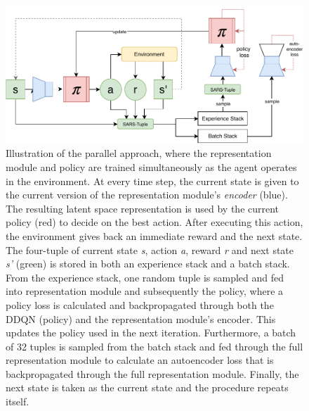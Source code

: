 \begin{figure}[ht]
	\centering
	\includegraphics[width=\textwidth]{img/full-model.pdf}
	\caption{Illustration of the parallel approach, where the representation module and policy are trained simultaneously as the agent operates in the environment. At every time step, the current state is given to the current version of the representation module's \textit{encoder} (blue). The resulting latent space representation is used by the current policy (red) to decide on the best action. After executing this action, the environment gives back an immediate reward and the next state. The four-tuple of current state \textit{s}, action \textit{a}, reward \textit{r} and next state \textit{s'} (green) is stored in both an experience stack and a batch stack. From the experience stack, one random tuple is sampled and fed into representation module and subsequently the policy, where a policy loss is calculated and backpropagated through both the DDQN (policy) and the representation module's encoder. This updates the policy used in the next iteration. Furthermore, a batch of 32 tuples is sampled from the batch stack and fed through the full representation module to calculate an autoencoder loss that is backpropagated through the full representation module. Finally, the next state is taken as the current state and the procedure repeats itself. \label{fig:approaches}}
\end{figure}